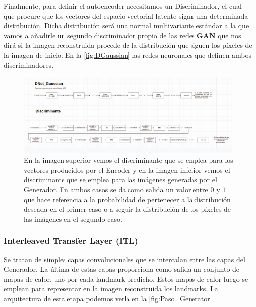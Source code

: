                 \noindent Finalmente, para definir el autoencoder necesitamos un Discriminador, el cual que procure que los vectores del espacio vectorial latente sigan una determinada distribución. Dicha distribución será una normal multivariante estándar a la que vamos a añadirle un segundo discriminador propio de las redes \textbf{GAN} que nos dirá si la imagen reconstruida procede de la distribución que siguen los píxeles de la imagen de inicio. En la \autoref{fig:DGaussian} las redes neuronales que definen ambos discriminadores.

                \begin{figure}[!h]
                    \centering
                    \includegraphics[width=0.99\textwidth]{img/DGaussian.png}
                    \caption{En la imagen superior vemos el discriminante que se emplea para los vectores producidos por el Encoder y en la imagen inferior vemos el discriminante que se emplea para las imágenes generadas por el Generador. En ambos casos se da como salida un valor entre $0$ y $1$ que hace referencia a la probabilidad de pertenecer a la distribución deseada en el primer caso o a seguir la distribución de los píxeles de las imágenes en el segundo caso.}
                    \label{fig:DGaussian}
                \end{figure}

            \subsubsection{Interleaved Transfer Layer (ITL)}
                
                \noindent Se tratan de simples capas convolucionales que se intercalan entre las capas del Generador. La última de estas capas proporciona como salida un conjunto de mapas de calor, uno por cada landmark predicho. Estos mapas de calor luego se emplean para representar en la imagen reconstruida los landmarks. La arquitectura de esta etapa podemos verla en la \autoref{fig:Paso_Generator}.
                
